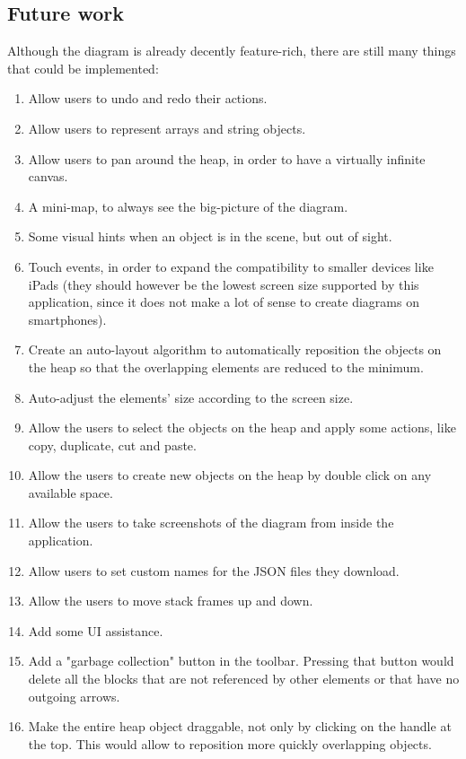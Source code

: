 \documentclass[]{usiinfbachelorproject}
\begin{document}
\subsection{Future work} \label{future work}

Although the diagram is already decently feature-rich, there are still many things that could be implemented:

\begin{enumerate}
	\item Allow users to undo and redo their actions.
	\item Allow users to represent arrays and string objects.
	\item Allow users to pan around the heap, in order to have a virtually infinite canvas.
	\item A mini-map, to always see the big-picture of the diagram.
	\item Some visual hints when an object is in the scene, but out of sight.
	\item Touch events, in order to expand the compatibility to 	smaller devices like iPads (they should however be the lowest screen size supported by this application, since it does not make a lot of sense to create diagrams on smartphones).
	\item Create an auto-layout algorithm to automatically reposition the objects on the heap so that the overlapping elements are reduced to the minimum.
	\item Auto-adjust the elements' size according to the screen size.
	\item Allow the users to select the objects on the heap and apply some actions, like copy, duplicate, cut and paste.

	\item Allow the users to create new objects on the heap by double click on any available space.
	\item Allow the users to take screenshots of the diagram from inside the application.
	\item Allow users to set custom names for the JSON files they download.
	\item Allow the users to move stack frames up and down.
	\item Add some UI assistance.
	\item Add a "garbage collection" button in the toolbar. Pressing that button would delete all the blocks that are not referenced by other elements or that have no outgoing arrows.
	\item Make the entire heap object draggable, not only by clicking on the handle at the top. This would allow to reposition more quickly overlapping objects. 
\end{enumerate}
\end{document}
